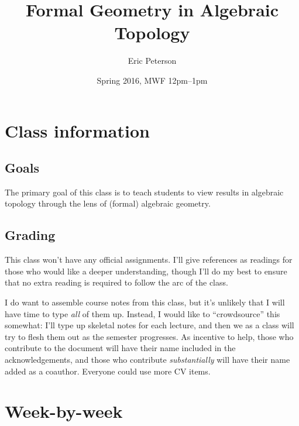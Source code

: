 \documentclass{article}
\title{Formal Geometry in Algebraic Topology}
\author{Eric Peterson}
\date{Spring 2016, MWF 12pm--1pm}
\newcommand{\<}{\langle}
\renewcommand{\>}{\rangle}
\begin{document}
\maketitle

\section{Class information}

\subsection{Goals}

The primary goal of this class is to teach students to view results in algebraic topology through the lens of (formal) algebraic geometry.

\subsection{Grading}

This class won't have any official assignments. I'll give references as readings for those who would like a deeper understanding, though I'll do my best to ensure that no extra reading is required to follow the arc of the class.

I do want to assemble course notes from this class, but it's unlikely that I will have time to type \emph{all} of them up. Instead, I would like to ``crowdsource'' this somewhat: I'll type up skeletal notes for each lecture, and then we as a class will try to flesh them out as the semester progresses. As incentive to help, those who contribute to the document will have their name included in the acknowledgements, and those who contribute \emph{substantially} will have their name added as a coauthor. Everyone could use more CV items.

\section{Week-by-week}
\end{document}
